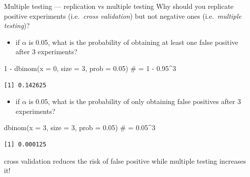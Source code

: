 \documentclass[
  ignorenonframetext,
  aspectratio=169,
  t]{beamer}
\newenvironment{Shaded}{\begin{snugshade}}{\end{snugshade}}
\newcommand{\AttributeTok}[1]{\textcolor[rgb]{0.40,0.45,0.13}{#1}}
\newcommand{\CommentTok}[1]{\textcolor[rgb]{0.37,0.37,0.37}{#1}}
\newcommand{\DecValTok}[1]{\textcolor[rgb]{0.68,0.00,0.00}{#1}}
\newcommand{\FloatTok}[1]{\textcolor[rgb]{0.68,0.00,0.00}{#1}}
\newcommand{\FunctionTok}[1]{\textcolor[rgb]{0.28,0.35,0.67}{#1}}
\newcommand{\NormalTok}[1]{\textcolor[rgb]{0.00,0.23,0.31}{#1}}
\newcommand{\SpecialCharTok}[1]{\textcolor[rgb]{0.37,0.37,0.37}{#1}}
\providecommand{\tightlist}{%
  \setlength{\itemsep}{0pt}\setlength{\parskip}{0pt}}
\newcommand{\blueit}[1]{\textcolor{bluebeamer}{\emph{#1}}}
\begin{document}
\begin{frame}[fragile]{Multiple testing --- replication vs multiple
testing}
\protect{}\label{multiple-testing-replication-vs-multiple-testing}
Why should you replicate positive experiments
(i.e.~\blueit{cross validation}) but not negative ones
(i.e.~\blueit{multiple testing})?

\begin{itemize}
\tightlist
\item
  if \(\alpha\) is 0.05, what is the probability of obtaining at least
  one false positive after 3 experiments?
\end{itemize}

\footnotesize

\begin{Shaded}
\begin{Highlighting}[]
\DecValTok{1} \SpecialCharTok{{-}} \FunctionTok{dbinom}\NormalTok{(}\AttributeTok{x =} \DecValTok{0}\NormalTok{, }\AttributeTok{size =} \DecValTok{3}\NormalTok{, }\AttributeTok{prob =} \FloatTok{0.05}\NormalTok{) }\CommentTok{\# = 1 {-} 0.95\^{}3}
\end{Highlighting}
\end{Shaded}

\begin{verbatim}
[1] 0.142625
\end{verbatim}

\normalsize

\pause

\begin{itemize}
\tightlist
\item
  if \(\alpha\) is 0.05, what is the probability of only obtaining false
  positives after 3 experiments?
\end{itemize}

\footnotesize

\begin{Shaded}
\begin{Highlighting}[]
\FunctionTok{dbinom}\NormalTok{(}\AttributeTok{x =} \DecValTok{3}\NormalTok{, }\AttributeTok{size =} \DecValTok{3}\NormalTok{, }\AttributeTok{prob =} \FloatTok{0.05}\NormalTok{) }\CommentTok{\# = 0.05\^{}3}
\end{Highlighting}
\end{Shaded}

\begin{verbatim}
[1] 0.000125
\end{verbatim}

\normalsize

\pause

\begin{callout}
cross validation reduces the risk of false positive while multiple testing increases it!
\end{callout}
\end{frame}
\end{document}
